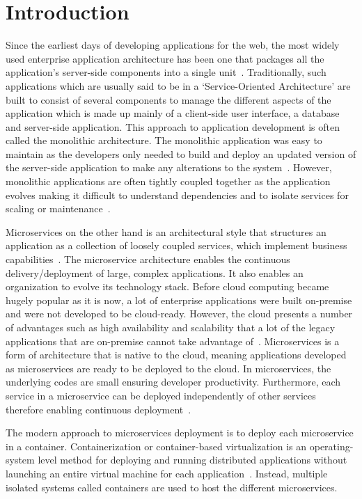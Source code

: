 \section{Introduction}

Since the earliest days of developing applications for the web, the
most widely used enterprise application architecture has been one that
packages all the application’s server-side components into a single
unit~\cite{hid-sp18-501-infoq}. Traditionally, such applications which
are usually said to be in a ‘Service-Oriented Architecture’ are built
to consist of several components to manage the different aspects of
the application which is made up mainly of a client-side user
interface, a database and server-side application. This approach to
application development is often called the monolithic
architecture. The monolithic application was easy to maintain as the
developers only needed to build and deploy an updated version of the
server-side application to make any alterations to the
system~\cite{hid-sp18-501-mulesoft}. However, monolithic applications
are often tightly coupled together as the application evolves making
it difficult to understand dependencies and to isolate services for
scaling or maintenance~\cite{hid-sp18-501-trello}.
 
Microservices on the other hand is an architectural style that
structures an application as a collection of loosely coupled services,
which implement business
capabilities~\cite{hid-sp18-501-microservicesio}. The microservice
architecture enables the continuous delivery/deployment of large,
complex applications. It also enables an organization to evolve its
technology stack. Before cloud computing became hugely popular as it
is now, a lot of enterprise applications were built on-premise and
were not developed to be cloud-ready. However, the cloud presents a
number of advantages such as high availability and scalability that a
lot of the legacy applications that are on-premise cannot take
advantage of~\cite{hid-sp18-501-springer}. Microservices is a form of
architecture that is native to the cloud, meaning applications
developed as microservices are ready to be deployed to the cloud. In
microservices, the underlying codes are small ensuring developer
productivity. Furthermore, each service in a microservice can be
deployed independently of other services therefore enabling continuous
deployment~\cite{hid-sp18-501-infoq}.

The modern approach to microservices deployment is to deploy each
microservice in a container. Containerization or container-based
virtualization is an operating-system level method for deploying and
running distributed applications without launching an entire virtual
machine for each application~\cite{hid-sp18-501-techtarget}. Instead,
multiple isolated systems called containers are used to host the
different microservices.

